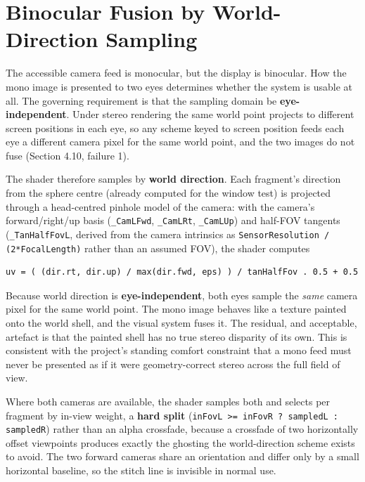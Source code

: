 
\section{Binocular Fusion by World-Direction Sampling}

The accessible camera feed is monocular, but the display is binocular. How the mono image is presented
to two eyes determines whether the system is usable at all. The governing requirement is that the
sampling domain be \textbf{eye-independent}. Under stereo rendering the same world point projects to
different screen positions in each eye, so any scheme keyed to screen position feeds each eye a
different camera pixel for the same world point, and the two images do not fuse (Section 4.10,
failure 1).

The shader therefore samples by \textbf{world direction}. Each fragment's direction from the
sphere centre (already computed for the window test) is projected through a head-centred pinhole
model of the camera: with the camera's forward/right/up basis (\verb|_CamLFwd|, \verb|_CamLRt|, \verb|_CamLUp|) and
half-FOV tangents (\verb|_TanHalfFovL|, derived from the camera intrinsics as
\verb|SensorResolution / (2*FocalLength)| rather than an assumed FOV), the shader computes

\begin{verbatim}
uv = ( (dir.rt, dir.up) / max(dir.fwd, eps) ) / tanHalfFov . 0.5 + 0.5
\end{verbatim}

Because world direction is \textbf{eye-independent}, both eyes sample the \textit{same} camera pixel for the
same world point. The mono image behaves like a texture painted onto the world shell, and the visual
system fuses it. The residual, and acceptable, artefact is that the painted shell has no true
stereo disparity of its own. This is consistent with the project's standing comfort constraint that a
mono feed must never be presented as if it were geometry-correct stereo across the full field of view.

Where both cameras are available, the shader samples both and selects per fragment by in-view
weight, a \textbf{hard split} (\verb|inFovL >= inFovR ? sampledL : sampledR|) rather than an alpha crossfade,
because a crossfade of two horizontally offset viewpoints produces exactly the ghosting the
world-direction scheme exists to avoid. The two forward cameras share an orientation and differ only
by a small horizontal baseline, so the stitch line is invisible in normal use.

